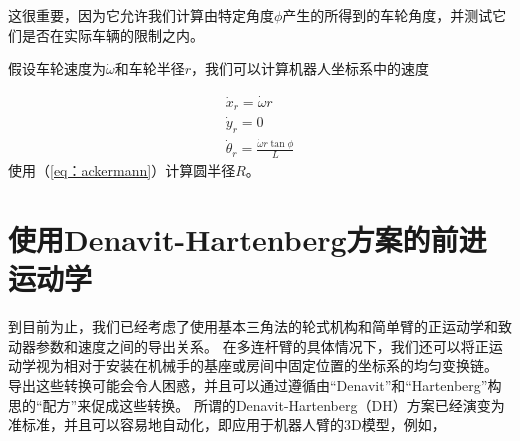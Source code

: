 这很重要，因为它允许我们计算由特定角度$ \phi $产生的所得到的车轮角度，并测试它们是否在实际车辆的限制之内。


假设车轮速度为$ \dot {\omega} $和车轮半径$ r $，我们可以计算机器人坐标系中的速度

\begin{eqnarray}
\dot{x}_r=\dot{\omega}r\\
\dot{y}_r=0\\
\dot{\theta}_r=\frac{\dot{\omega}r\tan\phi}{L}
\end{eqnarray}
使用（\ref {eq：ackermann}）计算圆半径$ R $。

\section{使用Denavit-Hartenberg方案的前进运动学}


到目前为止，我们已经考虑了使用基本三角法的轮式机构和简单臂的正运动学和致动器参数和速度之间的导出关系。 在多连杆臂的具体情况下，我们还可以将正运动学视为相对于安装在机械手的基座或房间中固定位置的坐标系的均匀变换链。 导出这些转换可能会令人困惑，并且可以通过遵循由“Denavit”和“Hartenberg”构思的“配方”来促成这些转换。 所谓的Denavit-Hartenberg（DH）方案已经演变为准标准，并且可以容易地自动化，即应用于机器人臂的3D模型，例如，

